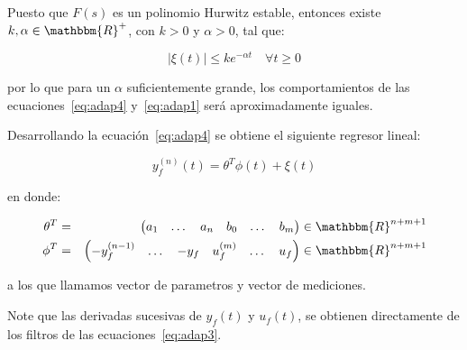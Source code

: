         Puesto que $F(s)$ es un polinomio Hurwitz estable, entonces existe $k, \alpha \in \mathbbm{R}^+$, con $k > 0$ y $\alpha > 0$, tal que:

        \begin{equation*}
            |\xi(t)| \le k e^{- \alpha t} \quad \forall t \ge 0
        \end{equation*}

        por lo que para un $\alpha$ suficientemente grande, los comportamientos de las ecuaciones~\ref{eq:adap4} y~\ref{eq:adap1} será aproximadamente iguales.

        Desarrollando la ecuación~\ref{eq:adap4} se obtiene el siguiente regresor lineal:

        \begin{equation}
            y_f^{(n)}(t) = \theta^T \phi(t) + \xi(t)
        \end{equation}

        en donde:

        \begin{eqnarray} \label{eq:adap5}
            \theta^T & = & \begin{pmatrix} a_1 & \dots & a_n & b_0 & \dots & b_m \end{pmatrix} \in \mathbbm{R}^{n+m+1} \nonumber \\
            \phi^T & = & \begin{pmatrix} -y_f^{(n-1)} & \dots & -y_f & u_f^{(m)} & \dots & u_f \end{pmatrix} \in \mathbbm{R}^{n+m+1}
        \end{eqnarray}

        a los que llamamos vector de parametros y vector de mediciones.

        Note que las derivadas sucesivas de $y_f(t)$ y $u_f(t)$, se obtienen directamente de los filtros de las ecuaciones~\ref{eq:adap3}.

